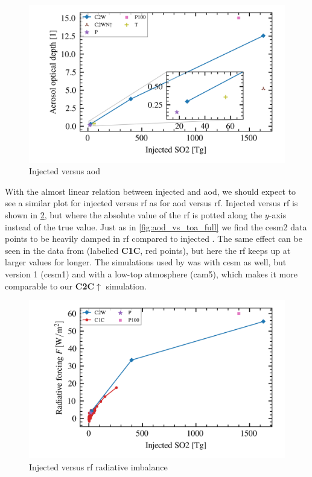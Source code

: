 \documentclass[twocol]{ametsocV5}
\newcommand{\iso}[1][i]{{#1}njected \ce{SO2}}
\begin{document}
\begin{figure}
  \begin{center}
    \includegraphics[width=0.95\linewidth]{figures/injection_vs_aod.png}
  \end{center}
  \caption{Injected  versus \acrshort{aod}}%
  \label{fig:so2_vs_aod}
\end{figure}


With the almost linear relation between injected  and \acrshort{aod}, we should
expect to see a similar plot for \iso{} versus \acrshort{rf} as for \acrshort{aod}
versus \acrshort{rf}. \iso[I] versus \acrshort{rf} is shown in \cref{fig:so2_vs_toa},
but where the absolute value of the \acrshort{rf} is potted along the \( y \)-axis
instead of the true value. Just as in \cref{fig:aod_vs_toa_full} we find the
\acrshort{cesm2} data points to be heavily damped in \acrshort{rf} compared to \iso. The
same effect can be seen in the data from \citet{ottobliesner2016} (labelled
\textbf{C1C}, red points), but here the \acrshort{rf} keeps up at larger values for
longer. The simulations used by \citet{ottobliesner2016} was with \acrshort{cesm} as
well, but version 1 (\acrshort{cesm1}) and with a low-top atmosphere (\acrshort{cam5}),
which makes it more comparable to our \textbf{C2C\(\uparrow\)} simulation.

\begin{figure}
  \begin{center}
    \includegraphics[width=0.95\linewidth]{figures/injection_vs_toa.png}
  \end{center}
  \caption{Injected  versus \acrshort{rf} radiative imbalance}%
  \label{fig:so2_vs_toa}
\end{figure}
\end{document}
